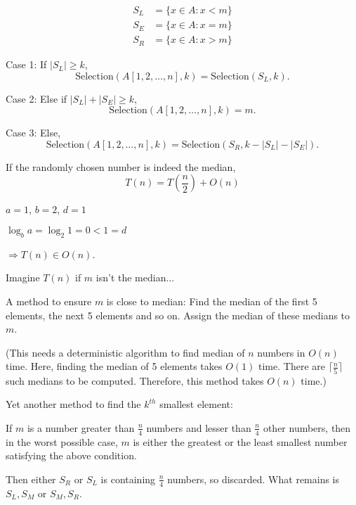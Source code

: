 \begin{align*}
	S_L & = \{x \in A : x < m\} \\
	S_E & = \{x \in A : x = m\} \\
	S_R & = \{x \in A : x > m\}
\end{align*}

Case 1: If $|S_L| \geq k$,
\[ \text{Selection}(A[1,2,\ldots,n], k) = \text{Selection}(S_L, k). \]

Case 2: Else if $|S_L| + |S_E| \geq k$,
\[ \text{Selection}(A[1,2,\ldots,n], k) = m. \]

Case 3: Else,
\[ \text{Selection}(A[1,2,\ldots,n], k) = \text{Selection}(S_R, k-|S_L|-|S_E|). \]

If the randomly chosen number is indeed the median,
\[ T(n) = T(\frac{n}{2}) + O(n) \]

$a = 1$, $b = 2$, $d = 1$

$\log_b a = \log_2 1 = 0 < 1 = d$

$\Rightarrow T(n) \in O(n)$.

Imagine $T(n)$ if $m$ isn't the median...

A method to ensure $m$ is close to median:
Find the median of the first 5 elements, the next 5 elements and so on.
Assign the median of these medians to $m$.

(This needs a deterministic algorithm to find median of $n$ numbers in $O(n)$ time. Here, finding the median of 5 elements takes $O(1)$ time. There are $\lceil \frac{n}{5} \rceil$ such medians to be computed. Therefore, this method takes $O(n)$ time.)

Yet another method to find the $k^{th}$ smallest element:

\begin{center}
\end{center}

If $m$ is a number greater than $\frac{n}{4}$ numbers and lesser than $\frac{n}{4}$ other numbers, then in the worst possible case, $m$ is either the greatest or the least smallest number satisfying the above condition.

Then either $S_R$ or $S_L$ is containing $\frac{n}{4}$ numbers, so discarded. What remains is $S_L, S_M$ or $S_M, S_R$.

